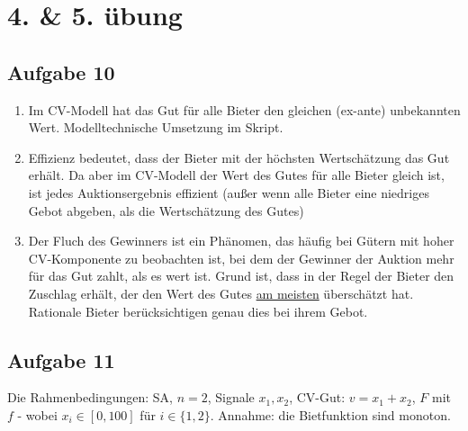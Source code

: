 \documentclass[12pt]{extreport} %
\theoremstyle{named}
\theoremstyle{nnamed}
\theoremstyle{itshape}
\theoremstyle{normal}
\begin{document}
\section*{4. \& 5. übung}

\subsection*{Aufgabe 10}

\begin{enumerate}[label=\alph*\upshape)]
	\item Im CV-Modell hat das Gut für alle Bieter den gleichen (ex-ante) unbekannten Wert. Modelltechnische Umsetzung im Skript.
	\item Effizienz bedeutet, dass der Bieter mit der höchsten Wertschätzung das Gut erhält. Da aber im CV-Modell der Wert des Gutes für alle Bieter gleich ist, ist jedes Auktionsergebnis effizient (außer wenn alle Bieter eine niedriges Gebot abgeben, als die Wertschätzung des Gutes)
	\item Der Fluch des Gewinners ist ein Phänomen, das häufig bei Gütern mit hoher CV-Komponente zu beobachten ist, bei dem der Gewinner der Auktion mehr für das Gut zahlt, als es wert ist. Grund ist, dass in der Regel der Bieter den Zuschlag erhält, der den Wert des Gutes \underline{am meisten} überschätzt hat. ~\\
		Rationale Bieter berücksichtigen genau dies bei ihrem Gebot.
\end{enumerate}

\subsection*{Aufgabe 11}

Die Rahmenbedingungen: SA, $n = 2$, Signale $x_1, x_2$, CV-Gut: $v = x_1 + x_2$, $F$ mit $f$ - wobei $x_{i} \in [0, 100]$ für $i \in \{1, 2 \}$. Annahme: die Bietfunktion sind monoton.
\end{document}
